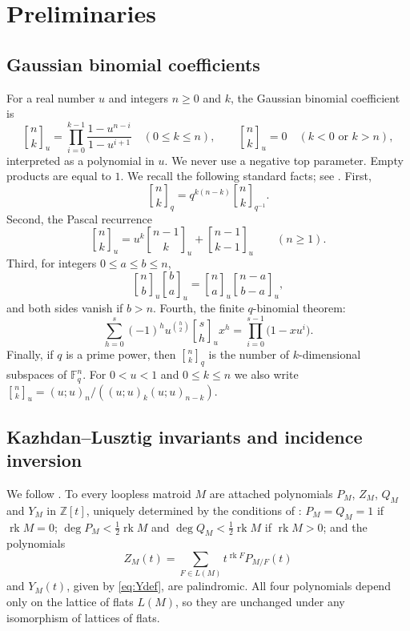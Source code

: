 \documentclass{amsart}
\theoremstyle{remark}
\numberwithin{equation}{section}
\newcommand{\qbinom}[3]{\genfrac{[}{]}{0pt}{}{#1}{#2}_{#3}}
\newcommand{\F}{\mathbb{F}}
\newcommand{\rk}{\operatorname{rk}}
\begin{document}
\section{Preliminaries}\label{sec:prelim}

\subsection{Gaussian binomial coefficients}
For a real number $u$ and integers $n\ge0$ and $k$, the Gaussian binomial coefficient is
\[
  \qbinom{n}{k}{u}=\prod_{i=0}^{k-1}\frac{1-u^{n-i}}{1-u^{i+1}}\quad(0\le k\le n),\qquad
  \qbinom{n}{k}{u}=0\quad(k<0\text{ or }k>n),
\]
interpreted as a polynomial in $u$. We never use a negative top parameter. Empty products are equal to $1$. We recall the following standard facts; see \cite[Chapter~3]{And}. First,
\begin{equation}\label{eq:inv}
  \qbinom{n}{k}{q}=q^{k(n-k)}\qbinom{n}{k}{q^{-1}}.
\end{equation}
Second, the Pascal recurrence
\begin{equation}\label{eq:pascal}
  \qbinom{n}{k}{u}=u^{k}\qbinom{n-1}{k}{u}+\qbinom{n-1}{k-1}{u}\qquad(n\ge1).
\end{equation}
Third, for integers $0\le a\le b\le n$,
\begin{equation}\label{eq:flag}
  \qbinom{n}{b}{u}\qbinom{b}{a}{u}=\qbinom{n}{a}{u}\qbinom{n-a}{b-a}{u},
\end{equation}
and both sides vanish if $b>n$. Fourth, the finite $q$-binomial theorem:
\begin{equation}\label{eq:qbinthm}
  \sum_{h=0}^{s}(-1)^h u^{\binom{h}{2}}\qbinom{s}{h}{u}x^h=\prod_{i=0}^{s-1}\bigl(1-xu^{i}\bigr).
\end{equation}
Finally, if $q$ is a prime power, then $\qbinom{n}{k}{q}$ is the number of $k$-dimensional subspaces of $\F_q^n$. For $0<u<1$ and $0\le k\le n$ we also write $\qbinom{n}{k}{u}=(u;u)_n/((u;u)_k(u;u)_{n-k})$.

\subsection{Kazhdan--Lusztig invariants and incidence inversion}
We follow \cite[Section~2.2]{BFMN}. To every loopless matroid $M$ are attached polynomials $P_M$, $Z_M$, $Q_M$ and $Y_M$ in $\mathbb{Z}[t]$, uniquely determined by the conditions of \cite[Theorems~2.1 and~2.2]{BFMN}: $P_M=Q_M=1$ if $\rk M=0$; $\deg P_M<\frac12\rk M$ and $\deg Q_M<\frac12\rk M$ if $\rk M>0$; and the polynomials
\begin{equation}\label{eq:Zdef}
  Z_M(t)=\sum_{F\in L(M)}t^{\rk F}P_{M/F}(t)
\end{equation}
and $Y_M(t)$, given by \eqref{eq:Ydef}, are palindromic. All four polynomials depend only on the lattice of flats $L(M)$, so they are unchanged under any isomorphism of lattices of flats.
\end{document}
